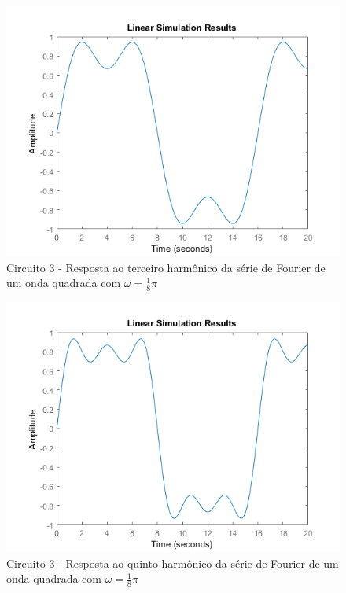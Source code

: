 \documentclass[a4paper, 12pt]{article}
\begin{document}
			\begin{figure}[!ht]
				\centering
				\includegraphics[scale=0.71]{img/1k_circ3.png}
				\caption{Circuito 3 - Resposta ao terceiro harmônico da série de Fourier de um onda quadrada com $\omega = \frac{1}{8}\pi$}
			\end{figure}
			\begin{figure}[!ht]
				\centering
				\includegraphics[scale=0.68]{img/1l_circ3.png}
				\caption{Circuito 3 - Resposta ao quinto harmônico da série de Fourier de um onda quadrada com $\omega = \frac{1}{8}\pi$}
			\end{figure}
\end{document}
